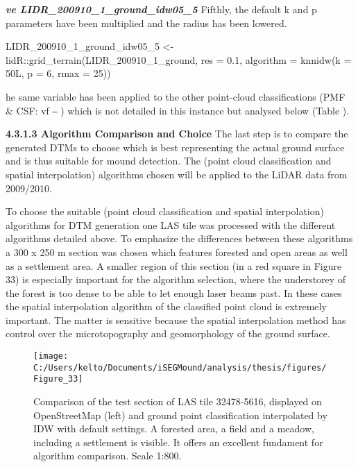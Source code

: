 \documentclass[
  12pt,
]{article}
\newenvironment{Shaded}{\begin{snugshade}}{\end{snugshade}}
\newcommand{\AttributeTok}[1]{\textcolor[rgb]{0.77,0.63,0.00}{#1}}
\newcommand{\DecValTok}[1]{\textcolor[rgb]{0.00,0.00,0.81}{#1}}
\newcommand{\FloatTok}[1]{\textcolor[rgb]{0.00,0.00,0.81}{#1}}
\newcommand{\FunctionTok}[1]{\textcolor[rgb]{0.00,0.00,0.00}{#1}}
\newcommand{\NormalTok}[1]{#1}
\newcommand{\OtherTok}[1]{\textcolor[rgb]{0.56,0.35,0.01}{#1}}
\newcommand{\SpecialCharTok}[1]{\textcolor[rgb]{0.00,0.00,0.00}{#1}}
\begin{document}
\textbf{\emph{ve LIDR\_200910\_1\_ground\_idw05\_5}}
\newline
Fifthly, the default k and p parameters have been multiplied and the radius has been lowered.

\begin{Shaded}
\begin{Highlighting}[]
\NormalTok{LIDR\_200910\_1\_ground\_idw05\_5 }\OtherTok{\textless{}{-}}\NormalTok{ lidR}\SpecialCharTok{::}\FunctionTok{grid\_terrain}\NormalTok{(LIDR\_200910\_1\_ground, }\AttributeTok{res =} \FloatTok{0.1}\NormalTok{,}
    \AttributeTok{algorithm =} \FunctionTok{knnidw}\NormalTok{(}\AttributeTok{k =}\NormalTok{ 50L, }\AttributeTok{p =} \DecValTok{6}\NormalTok{, }\AttributeTok{rmax =} \DecValTok{25}\NormalTok{))}
\end{Highlighting}
\end{Shaded}

he same variable has been applied to the other point-cloud classifications (PMF \& CSF: vf ⎯ ) which is not detailed in this instance but analysed below (Table ).

\textbf{4.3.1.3 Algorithm Comparison and Choice}
\newline
The last step is to compare the generated DTMs to choose which is best representing the actual ground surface and is thus suitable for mound detection. The (point cloud classification and spatial interpolation) algorithms chosen will be applied to the LiDAR data from 2009/2010.

To choose the suitable (point cloud classification and spatial interpolation) algorithms for DTM generation one LAS tile was processed with the different algorithms detailed above. To emphasize the differences between these algorithms a 300 x 250 m section was chosen which features forested and open areas as well as a settlement area. A smaller region of this section (in a red square in Figure 33) is especially important for the algorithm selection, where the understorey of the forest is too dense to be able to let enough laser beams past. In these cases the spatial interpolation algorithm of the classified point cloud is extremely important. The matter is sensitive because the spatial interpolation method has control over the microtopography and geomorphology of the ground surface.

\begin{figure}

{\centering \texttt{[image: C:/Users/kelto/Documents/iSEGMound/analysis/thesis/figures/Figure\_33]} 

}

\caption{Comparison of the test section of LAS tile 32478-5616, displayed on OpenStreetMap (left) and ground point classification interpolated by IDW with default settings. A forested area, a field and a meadow, including a settlement is visible. It offers an excellent fundament for algorithm comparison. Scale 1:800.}\label{fig:Figure33}
\end{figure}
\end{document}
